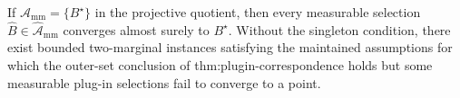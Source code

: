 If \(\mathcal A_{\mathrm{mm}}=\{B^\star\}\) in the projective quotient, then every measurable selection \(\widehat B\in\widehat{\mathcal A}_{\mathrm{mm}}\) converges almost surely to \(B^\star\).  Without the singleton condition, there exist bounded two-marginal instances satisfying the maintained assumptions for which the outer-set conclusion of thm:plugin-correspondence holds but some measurable plug-in selections fail to converge to a point.
